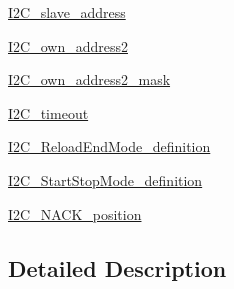\begin{DoxyCompactItemize}
\item 
\hyperlink{group___i2_c__slave__address}{I2\-C\-\_\-slave\-\_\-address}
\item 
\hyperlink{group___i2_c__own__address2}{I2\-C\-\_\-own\-\_\-address2}
\item 
\hyperlink{group___i2_c__own__address2__mask}{I2\-C\-\_\-own\-\_\-address2\-\_\-mask}
\item 
\hyperlink{group___i2_c__timeout}{I2\-C\-\_\-timeout}
\item 
\hyperlink{group___i2_c___reload_end_mode__definition}{I2\-C\-\_\-\-Reload\-End\-Mode\-\_\-definition}
\item 
\hyperlink{group___i2_c___start_stop_mode__definition}{I2\-C\-\_\-\-Start\-Stop\-Mode\-\_\-definition}
\item 
\hyperlink{group___i2_c___n_a_c_k__position}{I2\-C\-\_\-\-N\-A\-C\-K\-\_\-position}
\end{DoxyCompactItemize}


\subsection{Detailed Description}
